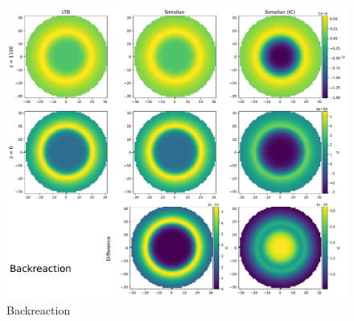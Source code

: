 \begin{figure}
    \centering
    \includegraphics[width=\textwidth]{../plots/Backreaction.pdf}
    \caption{Backreaction}
    \label{fig:backreaction}
\end{figure}